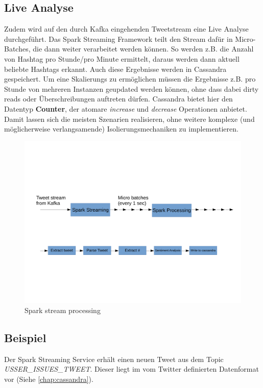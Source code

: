 \subsection*{Live Analyse}
Zudem wird auf den durch Kafka eingehenden Tweetstream eine Live Analyse durchgeführt.
Das Spark Streaming Framework teilt den Stream dafür in Micro-Batches, die dann weiter verarbeitet werden können.
So werden z.B. die Anzahl von Hashtag pro Stunde/pro Minute ermittelt, daraus werden dann aktuell beliebte Hashtags erkannt.
Auch diese Ergebnisse werden in Cassandra gespeichert.
Um eine Skalierungs zu ermöglichen müssen die Ergebnisse z.B. pro Stunde von mehreren Instanzen geupdated werden können, ohne dass dabei dirty reads oder Überschreibungen auftreten dürfen. Cassandra bietet hier den Datentyp \textbf{Counter}, der atomare \textit{increase} und \textit{decrease} Operationen anbietet. Damit lassen sich die meisten Szenarien realisieren, ohne weitere  komplexe (und möglicherweise verlangsamende) Isolierungsmechaniken zu implementieren.
\begin{figure}[Htbp!]
\centering
\includegraphics[width=\linewidth]{pics/analytics/streamProcessing.pdf}
\caption{Spark stream processing}
\label{fig:streamProcessing}
\end{figure}

\subsection*{Beispiel}

Der Spark Streaming Service erhält einen neuen Tweet aus dem Topic \textit{USSER\_ISSUES\_TWEET}.
Dieser liegt im vom Twitter definierten Datenformat vor (Siehe \ref{chap:cassandra}).

